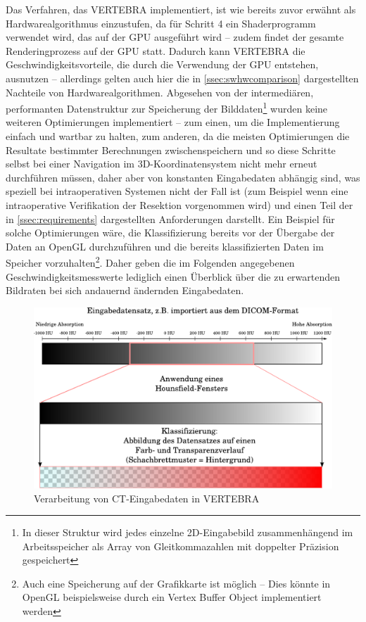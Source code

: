 \documentclass[ngerman,pdftex,paper=A4,DIV=calc,titlepage,12pt]{scrartcl}
\newtheorem[L]{boxedDefinition}{Definition}
\begin{document}
Das Verfahren, das VERTEBRA implementiert, ist wie bereits zuvor erwähnt als Hardwarealgorithmus einzustufen, da für Schritt 4 ein Shaderprogramm verwendet wird, das auf der GPU ausgeführt wird -- zudem findet der gesamte Renderingprozess auf der GPU statt. Dadurch kann VERTEBRA die Geschwindigkeitsvorteile, die durch die Verwendung der GPU entstehen, ausnutzen -- allerdings gelten auch hier die in \vref{ssec:swhwcomparison} dargestellten Nachteile von Hardwarealgorithmen. Abgesehen von der intermediären, performanten Datenstruktur zur Speicherung der Bilddaten\footnote{In dieser Struktur wird jedes einzelne 2D-Eingabebild zusammenhängend im Arbeitsspeicher als Array von Gleitkommazahlen mit doppelter Präzision gespeichert} wurden keine weiteren Optimierungen implementiert -- zum einen, um die Implementierung einfach und wartbar zu halten, zum anderen, da die meisten Optimierungen die Resultate bestimmter Berechnungen zwischenspeichern und so diese Schritte selbst bei einer Navigation im 3D-Koordinatensystem nicht mehr erneut durchführen müssen, daher aber von konstanten Eingabedaten abhängig sind, was speziell bei intraoperativen Systemen nicht der Fall ist (zum Beispiel wenn eine intraoperative Verifikation der Resektion vorgenommen wird) und einen Teil der in \vref{ssec:requirements} dargestellten Anforderungen darstellt. Ein Beispiel für solche Optimierungen wäre, die Klassifizierung bereits vor der Übergabe der Daten an OpenGL durchzuführen und die bereits klassifizierten Daten im Speicher vorzuhalten\footnote{Auch eine Speicherung auf der Grafikkarte ist möglich -- Dies könnte in OpenGL beispielsweise durch ein Vertex Buffer Object implementiert werden}. Daher geben die im Folgenden angegebenen Geschwindigkeitsmesswerte lediglich einen Überblick über die zu erwartenden Bildraten bei sich andauernd ändernden Eingabedaten.

\begin{figure}[p]
\begin{center}
\includegraphics[width=\textwidth]{graphics/Classification.pdf}
\caption{Verarbeitung von CT-Eingabedaten in VERTEBRA}
\label{fig:gradientmapping-graphic}
\end{center}
\end{figure}\label{ssec:implementations}
\end{document}
